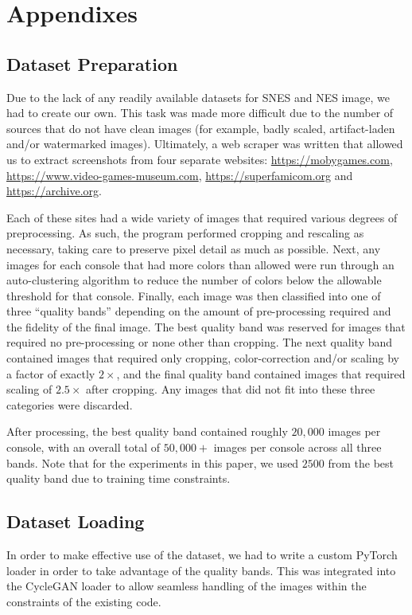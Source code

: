 \documentclass[10pt,twocolumn,letterpaper]{article}
\begin{document}
\section{Appendixes}
\subsection{Dataset Preparation}
Due to the lack of any readily available datasets for SNES and NES image, we had to create our own.
This task was made more difficult due to the number of sources that do not have clean images (for example, badly scaled, artifact-laden and/or watermarked images).
Ultimately, a web scraper was written that allowed us to extract screenshots from four separate websites: \url{https://mobygames.com}, \url{https://www.video-games-museum.com}, \url{https://superfamicom.org} and \url{https://archive.org}.

Each of these sites had a wide variety of images that required various degrees of preprocessing. As such, the program performed cropping and rescaling as necessary, taking care to preserve pixel detail as much as possible.
Next, any images for each console that had more colors than allowed were run through an auto-clustering algorithm to reduce the number of colors below the allowable threshold for that console.
Finally, each image was then classified into one of three ``quality bands'' depending on the amount of pre-processing required and the fidelity of the final image. The best quality band was reserved for images that required no pre-processing or none other than cropping. The next quality band contained images that  required only cropping, color-correction and/or scaling by a factor of exactly $2\times$, and the final quality band contained images that required scaling of $2.5\times$ after cropping. Any images that did not fit into these three categories were discarded.

After processing, the best quality band contained roughly $20,000$ images per console, with an overall total of $50,000+$ images per console across all three bands. Note that for the experiments in this paper, we used $2500$ from the best quality band due to training time constraints.

\subsection{Dataset Loading}
In order to make effective use of the dataset, we had to write a custom PyTorch loader in order to take advantage of the quality bands. This was integrated into the CycleGAN loader to allow seamless handling of the images within the constraints of the existing code.
\end{document}
